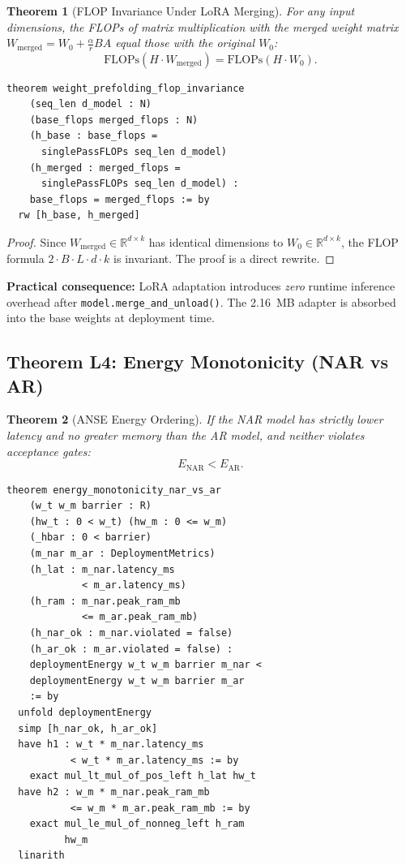 \documentclass[10pt,journal,compsoc]{IEEEtran}
\newtheorem{theorem}{Theorem}
\theoremstyle{remark}
\begin{document}
\begin{theorem}[FLOP Invariance Under LoRA Merging]
For any input dimensions, the FLOPs of matrix multiplication with the merged weight matrix $W_{\text{merged}} = W_0 + \frac{\alpha}{r}BA$ equal those with the original $W_0$:
\begin{equation}
\text{FLOPs}(H \cdot W_{\text{merged}}) = \text{FLOPs}(H \cdot W_0).
\end{equation}
\end{theorem}

\begin{lstlisting}[caption={Theorem L3 in Lean 4 --- Proved by \texttt{rfl}}]
theorem weight_prefolding_flop_invariance
    (seq_len d_model : N)
    (base_flops merged_flops : N)
    (h_base : base_flops =
      singlePassFLOPs seq_len d_model)
    (h_merged : merged_flops =
      singlePassFLOPs seq_len d_model) :
    base_flops = merged_flops := by
  rw [h_base, h_merged]
\end{lstlisting}

\begin{proof}
Since $W_{\text{merged}} \in \mathbb{R}^{d \times k}$ has identical dimensions to $W_0 \in \mathbb{R}^{d \times k}$, the FLOP formula $2 \cdot B \cdot L \cdot d \cdot k$ is invariant. The proof is a direct rewrite.
\end{proof}

\textbf{Practical consequence:} LoRA adaptation introduces \emph{zero} runtime inference overhead after \texttt{model.merge\_and\_unload()}. The 2.16~MB adapter is absorbed into the base weights at deployment time.

\subsection{Theorem L4: Energy Monotonicity (NAR vs AR)}

\begin{theorem}[ANSE Energy Ordering]
If the NAR model has strictly lower latency and no greater memory than the AR model, and neither violates acceptance gates:
\begin{equation}
E_{\text{NAR}} < E_{\text{AR}}.
\end{equation}
\end{theorem}

\begin{lstlisting}[caption={Theorem L4 in Lean 4 --- Fully Proved}]
theorem energy_monotonicity_nar_vs_ar
    (w_t w_m barrier : R)
    (hw_t : 0 < w_t) (hw_m : 0 <= w_m)
    (_hbar : 0 < barrier)
    (m_nar m_ar : DeploymentMetrics)
    (h_lat : m_nar.latency_ms
             < m_ar.latency_ms)
    (h_ram : m_nar.peak_ram_mb
             <= m_ar.peak_ram_mb)
    (h_nar_ok : m_nar.violated = false)
    (h_ar_ok : m_ar.violated = false) :
    deploymentEnergy w_t w_m barrier m_nar <
    deploymentEnergy w_t w_m barrier m_ar
    := by
  unfold deploymentEnergy
  simp [h_nar_ok, h_ar_ok]
  have h1 : w_t * m_nar.latency_ms
           < w_t * m_ar.latency_ms := by
    exact mul_lt_mul_of_pos_left h_lat hw_t
  have h2 : w_m * m_nar.peak_ram_mb
           <= w_m * m_ar.peak_ram_mb := by
    exact mul_le_mul_of_nonneg_left h_ram
          hw_m
  linarith
\end{lstlisting}
\end{document}
